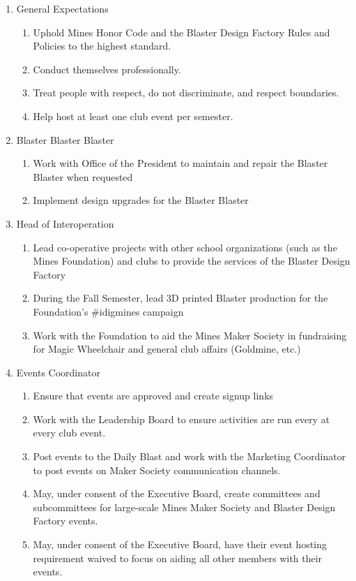 \documentclass[12pt,letterpaper]{article}
\begin{document}
\begin{enumerate}
    \item General Expectations 
    \begin{enumerate}
        \item Uphold Mines Honor Code and the Blaster Design Factory Rules and Policies to the highest standard. 
        \item Conduct themselves professionally.
        \item Treat people with respect, do not discriminate, and respect boundaries.
        \item Help host at least one club event per semester.
    \end{enumerate}
    
    \item Blaster Blaster Blaster
    \begin{enumerate}
        \item Work with Office of the President to maintain and repair the Blaster Blaster when requested
        \item Implement design upgrades for the Blaster Blaster 
    \end{enumerate}

    \item Head of Interoperation
    \begin{enumerate}
        \item Lead co-operative projects with other school organizations (such as the Mines Foundation) and clubs to provide the services of the Blaster Design Factory
        \item During the Fall Semester, lead 3D printed Blaster production for the Foundation’s \#idigmines campaign
        \item Work with the Foundation to aid the Mines Maker Society in fundraising for Magic Wheelchair and general club affairs (Goldmine, etc.)
    \end{enumerate}

    \item Events Coordinator  
    \begin{enumerate}
        \item Ensure that events are approved and create signup links
        \item Work with the Leadership Board to ensure activities are run every at every club event. 
        \item Post events to the Daily Blast and work with the Marketing Coordinator to post events on Maker Society communication channels.
        \item May, under consent of the Executive Board, create committees and subcommittees for large-scale Mines Maker Society and Blaster Design Factory events.
        \item May, under consent of the Executive Board, have their event hosting requirement waived to focus on aiding all other members with their events.
    \end{enumerate}


\end{enumerate}
\end{document}

